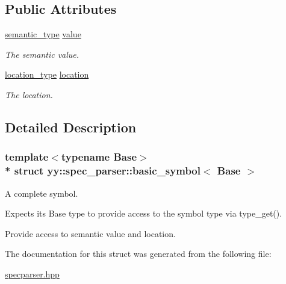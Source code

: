 \subsection*{Public Attributes}
\begin{DoxyCompactItemize}
\item 
\hyperlink{classyy_1_1spec__parser_a92c353b780abe51b48e92c71f7e4e9c8}{semantic\+\_\+type} \hyperlink{structyy_1_1spec__parser_1_1basic__symbol_abf2cac8dd3cb6f84e972b98d1ac52e5a}{value}\hypertarget{structyy_1_1spec__parser_1_1basic__symbol_abf2cac8dd3cb6f84e972b98d1ac52e5a}{}\label{structyy_1_1spec__parser_1_1basic__symbol_abf2cac8dd3cb6f84e972b98d1ac52e5a}

\begin{DoxyCompactList}\small\item\em The semantic value. \end{DoxyCompactList}\item 
\hyperlink{classyy_1_1spec__parser_aeb5b1e66f65306eca737db5dfa61590d}{location\+\_\+type} \hyperlink{structyy_1_1spec__parser_1_1basic__symbol_ab1f43b457044e720a7cf941719220133}{location}\hypertarget{structyy_1_1spec__parser_1_1basic__symbol_ab1f43b457044e720a7cf941719220133}{}\label{structyy_1_1spec__parser_1_1basic__symbol_ab1f43b457044e720a7cf941719220133}

\begin{DoxyCompactList}\small\item\em The location. \end{DoxyCompactList}\end{DoxyCompactItemize}


\subsection{Detailed Description}
\subsubsection*{template$<$typename Base$>$\\*
struct yy\+::spec\+\_\+parser\+::basic\+\_\+symbol$<$ Base $>$}

A complete symbol.

Expects its Base type to provide access to the symbol type via type\+\_\+get().

Provide access to semantic value and location. 

The documentation for this struct was generated from the following file\+:\begin{DoxyCompactItemize}
\item 
\hyperlink{specparser_8hpp}{specparser.\+hpp}\end{DoxyCompactItemize}
